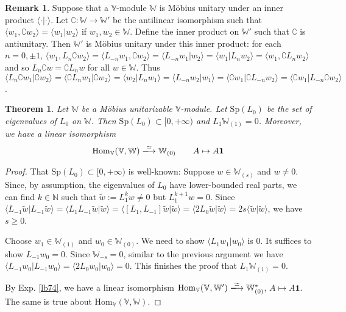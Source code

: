 \documentclass[11pt,b5paper,notitlepage]{article}
\theoremstyle{definition}
\newtheorem{rem}[df]{Remark}
\theoremstyle{plain}
\newtheorem{thm}[df]{Theorem}
\newcommand{\wtd}{\widetilde}
\newcommand{\id}{\mathbf{1}}
\newcommand{\Hom}{\mathrm{Hom}}
\newcommand{\bk}[1]{\langle {#1}\rangle}
\newcommand{\Co}{\complement}
\newcommand{\Vbb}{\mathbb V}
\newcommand{\Wbb}{\mathbb W}
\newcommand{\Nbb}{\mathbb N}
\newcommand{\Sp}{\mathrm{Sp}}
\numberwithin{equation}{section}
\begin{document}
\begin{rem}
Suppose that a $\Vbb$-module $\Wbb$ is M\"obius unitary under an inner product $\bk{\cdot|\cdot}$. Let $\Co:\Wbb\rightarrow\Wbb'$ be the antilinear isomorphism such that $\bk{w_1,\Co w_2}=\bk{w_1|w_2}$ if $w_1,w_2\in\Wbb$. Define the inner product on $\Wbb'$ such that $\Co$ is antiunitary. Then $\Wbb'$ is M\"obius unitary under this inner product: for each $n=0,\pm1$, $\bk{w_1,L_n\Co w_2}=\bk{L_{-n}w_1,\Co w_2}=\bk{L_{-n}w_1|w_2}=\bk{w_1|L_nw_2}=\bk{w_1,\Co L_nw_2}$ and so $L_n\Co w=\Co L_n w$ for all $w\in\Wbb$. Thus $\bk{L_n\Co w_1|\Co w_2}=\bk{\Co L_n w_1|\Co w_2}=\bk{w_2| L_n w_1}=\bk{L_{-n}w_2|w_1}=\bk{\Co w_1|\Co L_{-n}w_2}=\bk{\Co w_1|L_{-n}\Co w_2}$. 
\end{rem}


\begin{thm}\label{lb75}
Let $\Wbb$ be a M\"obius unitarizable $\Vbb$-module. Let $\Sp(L_0)$ be the set of eigenvalues of $L_0$ on $\Wbb$. Then $\Sp(L_0)\subset[0,+\infty)$ and $L_1\Wbb_{(1)}=0$. Moreover, we have a linear isomorphism 
\begin{align*}
\Hom_\Vbb(\Vbb,\Wbb)\xlongrightarrow{\simeq}\Wbb_{(0)}\qquad A\mapsto A\id
\end{align*} 
\end{thm}


\begin{proof}
That $\Sp(L_0)\subset[0,+\infty)$ is well-known: Suppose $w\in\Wbb_{(s)}$ and $w\neq0$. Since, by assumption, the eigenvalues of $L_0$ have lower-bounded real parts, we can find $k\in\Nbb$ such that $\wtd w:=L_1^kw\neq 0$ but $L_1^{k+1}w=0$. Since $\bk{L_{-1}\wtd w|L_{-1}\wtd w}=\bk{L_1L_{-1}\wtd w|\wtd w}=\bk{[L_1,L_{-1}]\wtd w|\wtd w}=\bk{2L_0\wtd w|\wtd w}=2s\bk{\wtd w|\wtd w}$, we have $s\geq 0$.

Choose $w_1\in\Wbb_{(1)}$ and $w_0\in \Wbb_{(0)}$. We need to show $\bk{L_1 w_1|w_0}$ is $0$. It suffices to show $L_{-1}w_0=0$. Since $\Wbb_{-s}=0$, similar to the previous argument we have $\bk{L_{-1}w_0|L_{-1}w_0}=\bk{2L_0 w_0|w_0}=0$. This finishes the proof that $L_1\Wbb_{(1)}=0$.

By Exp. \ref{lb74}, we have a linear isomorphism $\Hom_\Vbb(\Vbb,\Wbb')\xlongrightarrow{\simeq}\Wbb_{(0)}^*$, $A\mapsto A\id$. The same is true about $\Hom_\Vbb(\Vbb,\Wbb)$.
\end{proof}
\end{document}
